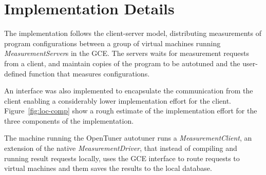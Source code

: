 \documentclass[12pt]{article}
\begin{document}

\section{Implementation Details}
\label{sec:ext}

The implementation follows the client-server model, distributing
measurements of program configurations between a group of virtual
machines running \emph{MeasurementServer}s in the GCE. The servers
waits for measurement requests from a client, and maintain copies
of the program to be autotuned and the user-defined function that
measures configurations.

An interface was also implemented to encapsulate the communication
from the client enabling a considerably lower implementation
effort for the client. Figure~\ref{fig:loc-comp} show a rough
estimate of the implementation effort for the three components
of the implementation.

The machine running the OpenTuner autotuner runs a \emph{MeasurementClient},
an extension of the native \emph{MeasurementDriver}, that instead of
compiling and running result requests locally, uses the GCE interface to
route requests to virtual machines and them saves the results to the local
database.
\end{document}
